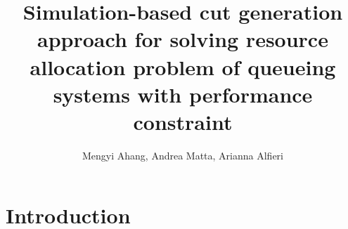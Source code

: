 \documentclass{article}
\title{Simulation-based cut generation approach for solving resource allocation problem of queueing systems with performance constraint}
\author{Mengyi Ahang, Andrea Matta, Arianna Alfieri }
\begin{document}
\maketitle

\section{Introduction}
\end{document}
